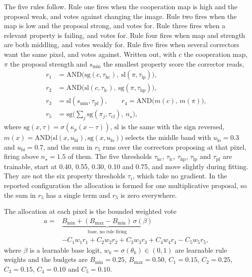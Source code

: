 The five rules follow. Rule one fires when the cooperation map is high and the proposal weak, and
votes against changing the image. Rule two fires when the map is low and the proposal strong, and
votes for. Rule three fires when a relevant property is failing, and votes for. Rule four fires when
map and strength are both middling, and votes weakly for. Rule five fires when several correctors
want the same pixel, and votes against. Written out, with $c$ the cooperation map, $\pi$ the proposal
strength and $s_{\min}$ the smallest property score the corrector reads,
\begin{equation}
\begin{aligned}
r_1 &= \mathrm{AND}\big(\mathrm{sg}(c, \tau_{\mathrm{hc}}),\ \mathrm{sl}(\pi, \tau_{\mathrm{lp}})\big), \\
r_2 &= \mathrm{AND}\big(\mathrm{sl}(c, \tau_{\mathrm{lc}}),\ \mathrm{sg}(\pi, \tau_{\mathrm{hp}})\big), \\
r_3 &= \mathrm{sl}(s_{\min}, \tau_{\mathrm{pf}}), \qquad
r_4 = \mathrm{AND}\big(m(c),\, m(\pi)\big), \\
r_5 &= \mathrm{sg}\big(\textstyle\sum_j \mathrm{sg}(\pi_j, \tau_{\mathrm{cf}}),\ n_\star\big),
\end{aligned}
\label{eq:rules}
\end{equation}
where $\mathrm{sg}(x,\tau) = \sigma(\kappa_p(x-\tau))$, $\mathrm{sl}$ is the same with the sign
reversed, $m(x) = \mathrm{AND}\big(\mathrm{sl}(x,u_{\mathrm{hi}}), \mathrm{sg}(x,u_{\mathrm{lo}})\big)$
selects the middle band with $u_{\mathrm{lo}} = 0.3$ and $u_{\mathrm{hi}} = 0.7$, and the sum in
$r_5$ runs over the correctors proposing at that pixel, firing above $n_\star = 1.5$ of them. The five thresholds
$\tau_{\mathrm{hc}}$, $\tau_{\mathrm{lc}}$, $\tau_{\mathrm{hp}}$, $\tau_{\mathrm{lp}}$ and
$\tau_{\mathrm{pf}}$ are trainable, start at 0.40, 0.55, 0.30, 0.10 and 0.75, and move slightly
during fitting. They are not the six property thresholds $\tau_i$, which take no gradient. In the
reported configuration the allocation is formed for one multiplicative proposal, so the sum in $r_5$
has a single term and $r_5$ is zero everywhere.

The allocation at each pixel is the bounded weighted vote
\begin{equation}
\begin{aligned}
a ={}& \underbrace{B_{\min} + (B_{\max} - B_{\min})\,\sigma(\beta)}_{\text{base, no rule firing}} \\
    &- C_1 w_1 r_1 + C_2 w_2 r_2 + C_3 w_3 r_3 + C_4 w_4 r_4 - C_5 w_5 r_5 ,
\end{aligned}
\label{eq:allocation}
\end{equation}
where $\beta$ is a learnable base logit, $w_k = \sigma(\theta_k) \in (0,1)$ are learnable rule weights
and the budgets are $B_{\min} = 0.25$, $B_{\max} = 0.50$, $C_1 = 0.15$, $C_2 = 0.25$, $C_3 = 0.15$,
$C_4 = 0.10$ and $C_5 = 0.10$.


